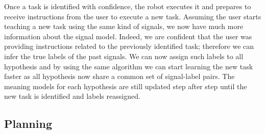 Once a task is identified with confidence, the robot executes it and prepares to receive instructions from the user to execute a new task. Assuming the user starts teaching a new task using the same kind of signals, we now have much more information about the signal model. Indeed, we are confident that the user was providing instructions related to the previously identified task; therefore we can infer the true labels of the past signals. We can now  assign such labels to all hypothesis and by using the same algorithm we can start learning the new task faster as all hypothesis now share a common set of signal-label pairs. The meaning models for each hypothesis are still updated step after step until the new task is identified and labels reassigned.

\subsection{Planning}


